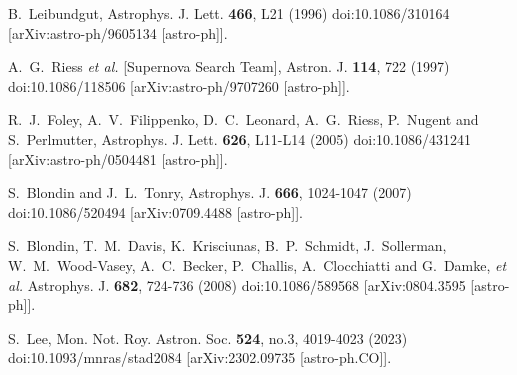 \documentclass[jkps,preprint,fleqn]{revtex4} %
\begin{document}
\begin{thebibliography}{999}

B.~Leibundgut,
Astrophys. J. Lett. \textbf{466}, L21 (1996)
doi:10.1086/310164
[arXiv:astro-ph/9605134 [astro-ph]].

A.~G.~Riess \textit{et al.} [Supernova Search Team],
Astron. J. \textbf{114}, 722 (1997)
doi:10.1086/118506
[arXiv:astro-ph/9707260 [astro-ph]].


R.~J.~Foley, A.~V.~Filippenko, D.~C.~Leonard, A.~G.~Riess, P.~Nugent and S.~Perlmutter,
Astrophys. J. Lett. \textbf{626}, L11-L14 (2005)
doi:10.1086/431241
[arXiv:astro-ph/0504481 [astro-ph]].

S.~Blondin and J.~L.~Tonry,
Astrophys. J. \textbf{666}, 1024-1047 (2007)
doi:10.1086/520494
[arXiv:0709.4488 [astro-ph]].

S.~Blondin, T.~M.~Davis, K.~Krisciunas, B.~P.~Schmidt, J.~Sollerman, W.~M.~Wood-Vasey, A.~C.~Becker, P.~Challis, A.~Clocchiatti and G.~Damke, \textit{et al.}
Astrophys. J. \textbf{682}, 724-736 (2008)
doi:10.1086/589568
[arXiv:0804.3595 [astro-ph]].


S.~Lee,
Mon. Not. Roy. Astron. Soc. \textbf{524}, no.3, 4019-4023 (2023)
doi:10.1093/mnras/stad2084
[arXiv:2302.09735 [astro-ph.CO]].


\end{thebibliography}
\end{document}
